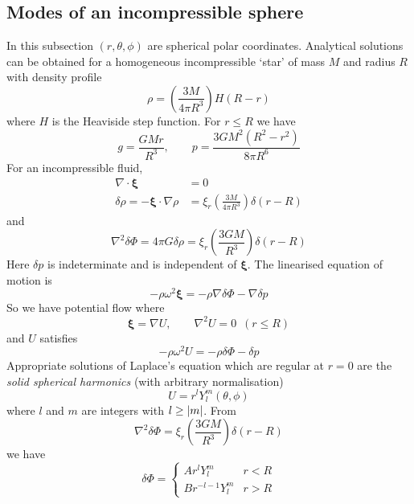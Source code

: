 \documentclass{jknotes}
\newcommand{\disp}{\symbf{\xi}}
\begin{document}
\subsection{Modes of an incompressible sphere}
In this subsection $(r, \theta, \phi)$ are spherical polar coordinates.
Analytical solutions can be obtained for a homogeneous incompressible `star'
of mass $M$ and radius $R$ with density profile
\begin{equation}
	\rho = \left( \frac{3M}{4\pi R^3}\right) H(R-r)
\end{equation}
where $H$ is the Heaviside step function. For $r \le R$ we have
\begin{equation}
	g = \frac{GMr}{R^3}, \hspace{2em} p = \frac{3GM^2(R^2-r^2)}{8\pi R^6}
\end{equation}
For an incompressible fluid,
\begin{align}
	\nabla \cdot \disp &= 0 \\
	\delta \rho = -\disp \cdot \nabla \rho &= \xi_r \left( \frac{3M}{4\pi
	R^3}\right) \delta(r-R)
\end{align}
and
\begin{equation}
	\nabla^2 \delta \Phi = 4\pi G \delta \rho = \xi_r \left(
	\frac{3GM}{R^3}\right)\delta(r-R)
\end{equation}
Here $\delta p$ is indeterminate and is independent of $\disp$. The linearised
equation of motion is
\begin{equation}
	-\rho \omega^2 \disp = -\rho \nabla \delta \Phi - \nabla \delta p
\end{equation}
So we have potential flow where
\begin{equation}
	\disp = \nabla U, \hspace{2em} \nabla^2 U = 0 \,\,\, (r \le R)
\end{equation}
and $U$ satisfies
\begin{equation}
	-\rho \omega^2 U = - \rho \delta \Phi - \delta p
\end{equation}
Appropriate solutions of Laplace's equation which are regular at $r=0$ are the
\emph{solid spherical harmonics} (with arbitrary normalisation)
\begin{equation}
	U = r^l Y_l^m(\theta,\phi)
\end{equation}
where $l$ and $m$ are integers with $l \ge \abs{m}$. From
\begin{equation}
	\nabla^2 \delta \Phi = \xi_r\left(\frac{3GM}{R^3}\right)\delta(r-R)
\end{equation}
we have
\begin{equation}
	\delta \Phi = \begin{cases}
		Ar^lY_l^m & r < R \\
		Br^{-l-1}Y_l^m & r > R
	\end{cases}
\end{equation}
\end{document}
